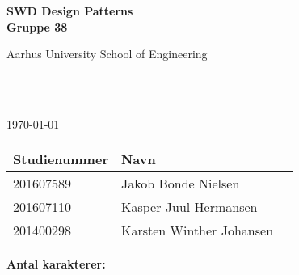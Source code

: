 \begin{center}
	{\fontsize{36pt}{0}\selectfont
		\textbf{
		SWD Design Patterns\\
		Gruppe 38\\
		}
	}
	\vspace{20pt}

	{\fontsize{14pt}{0}\selectfont
		Aarhus University School of Engineering\\
	}
	\vspace{20pt}

	{\fontsize{24pt}{0}\selectfont
		\thetitle\\
	}
	\vspace{20pt}

	{\fontsize{18pt}{0}\selectfont
		\ifdefined\frontpageDate
			\frontpageDate\\
		\else
			\today\\
		\fi
	}
	\vspace{20pt}

	\vspace{5pt}
	\begin{tabular}{|l|l|l|}
		\hline
		\rowcolor{gray!50}
		\textbf{Studienummer} & \textbf{Navn}\\ [5px]
		\hline
		201607589 & Jakob Bonde Nielsen\\
		\hline
		201607110 & Kasper Juul Hermansen\\
		\hline
		201400298 & Karsten Winther Johansen\\
		\hline
	\end{tabular}

	\ifdefined\frontpageCharacters
		\vspace{10pt}
		\textbf{Antal karakterer: } \frontpageCharacters\\
	\fi
	\vspace{30pt}

\end{center}
